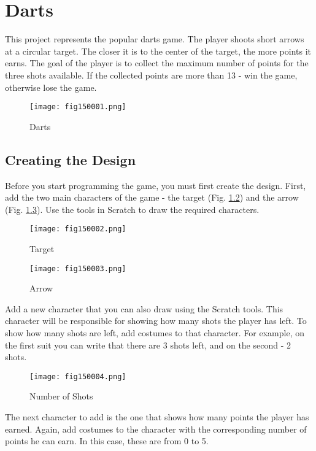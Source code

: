 \chapter{Darts}

This project represents the popular darts game. The player shoots short arrows at a circular target. The closer it is to the center of the target, the more points it earns. The goal of the player is to collect the maximum number of points for the three shots available. If the collected points are more than 13 - win the game, otherwise lose the game.

\begin{figure}[H]
   \centering
   \texttt{[image: fig150001.png]}
   \caption{Darts}
\label{fig150001}
\end{figure}

\section{Creating the Design}
Before you start programming the game, you must first create the design. First, add the two main characters of the game - the target (Fig. \ref{fig150002}) and the arrow (Fig. \ref{fig150003}). Use the tools in Scratch to draw the required characters.

\begin{figure}[H]
   \centering
   \texttt{[image: fig150002.png]}
   \caption{Target}
\label{fig150002}
\end{figure}

\begin{figure}[H]
   \centering
   \texttt{[image: fig150003.png]}
   \caption{Arrow}
\label{fig150003}
\end{figure}

Add a new character that you can also draw using the Scratch tools. This character will be responsible for showing how many shots the player has left. To show how many shots are left, add costumes to that character. For example, on the first suit you can write that there are 3 shots left, and on the second - 2 shots.

\begin{figure}[H]
   \centering
   \texttt{[image: fig150004.png]}
   \caption{Number of Shots}
\label{fig150004}
\end{figure}

The next character to add is the one that shows how many points the player has earned. Again, add costumes to the character with the corresponding number of points he can earn. In this case, these are from 0 to 5.

